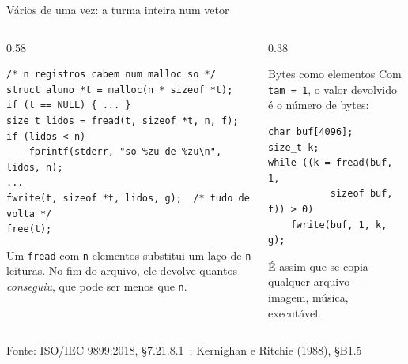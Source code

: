 \documentclass[aspectratio=169]{beamer}
\newcommand{\fonte}[1]{\vfill\hfill{\scriptsize\textcolor{UFSGray}{Fonte: #1}}}
\begin{document}
\begin{frame}[fragile]{Vários de uma vez: a turma inteira num vetor}
  \vspace{-0.4em}
  \begin{columns}[T]
    \begin{column}{0.58\textwidth}
\begin{lstlisting}[style=codCs]
/* n registros cabem num malloc so */
struct aluno *t = malloc(n * sizeof *t);
if (t == NULL) { ... }
size_t lidos = fread(t, sizeof *t, n, f);
if (lidos < n)
    fprintf(stderr, "so %zu de %zu\n", lidos, n);
...
fwrite(t, sizeof *t, lidos, g);  /* tudo de volta */
free(t);
\end{lstlisting}
      \small Um \texttt{fread} com \texttt{n} elementos substitui um laço de
      \texttt{n} leituras. No fim do arquivo, ele devolve quantos
      \emph{conseguiu}, que pode ser menos que \texttt{n}.
    \end{column}
    \begin{column}{0.38\textwidth}
      \begin{block}{Bytes como elementos}
        \small Com \texttt{tam = 1}, o valor devolvido é o número de
        bytes:
      \end{block}
\begin{lstlisting}[style=codCs]
char buf[4096];
size_t k;
while ((k = fread(buf, 1,
           sizeof buf, f)) > 0)
    fwrite(buf, 1, k, g);
\end{lstlisting}
      \small É assim que se copia qualquer arquivo --- imagem, música,
      executável.
    \end{column}
  \end{columns}
  \fonte{ISO/IEC 9899:2018, §7.21.8.1~\cite{iso2018c17};
    Kernighan e Ritchie (1988), §B1.5~\cite{kernighan1988c}}
\end{frame}
\end{document}

